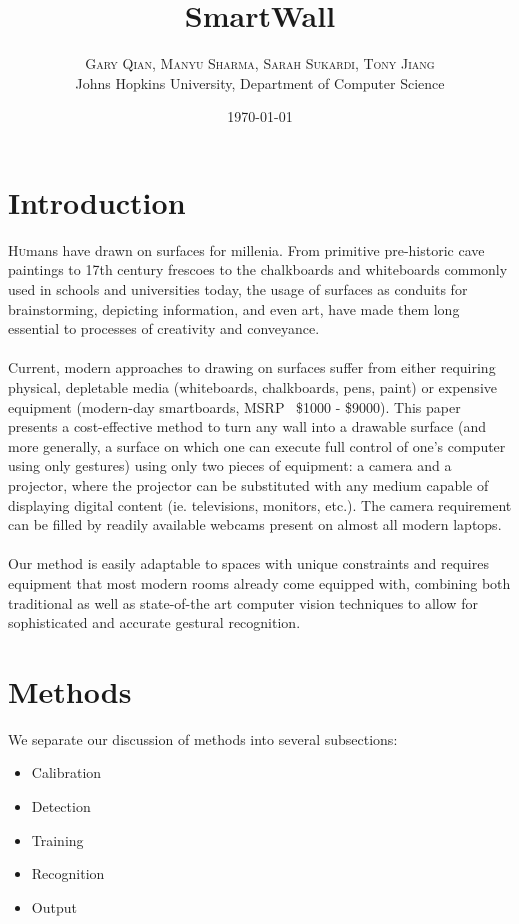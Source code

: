\documentclass[twoside,twocolumn]{article}
\title{SmartWall} %
\author{%
\textsc{Gary Qian, Manyu Sharma, Sarah Sukardi, Tony Jiang}\\[1ex] %
\normalsize Johns Hopkins University, Department of Computer Science \\ %
}
\date{\today} %
\begin{document}
\maketitle


\section{Introduction}

\lettrine[nindent=0em,lines=3]{H} umans have drawn on surfaces for millenia. From primitive pre-historic cave paintings to 17th century frescoes to the chalkboards and whiteboards commonly used in schools and universities today, the usage of surfaces as conduits for brainstorming, depicting information, and even art, have made them long essential to processes of creativity and conveyance.\\ \\Current, modern approaches to drawing on surfaces suffer from either requiring physical, depletable media (whiteboards, chalkboards, pens, paint) or expensive equipment (modern-day smartboards, MSRP ~\$1000 - \$9000). This paper presents a cost-effective method to turn any wall into a drawable surface (and more generally, a surface on which one can execute full control of one's computer using only gestures) using only two pieces of equipment: a camera and a projector, where the projector can be substituted with any medium capable of displaying digital content (ie. televisions, monitors, etc.). The camera requirement can be filled by readily available webcams present on almost all modern laptops.\\ \\ Our method is easily adaptable to spaces with unique constraints and requires equipment that most modern rooms already come equipped with, combining both traditional as well as state-of-the art computer vision techniques to allow for sophisticated and accurate gestural recognition.
\section{Methods}

We separate our discussion of methods into several subsections:
\begin{itemize}
\item Calibration
\item Detection
\item Training
\item Recognition
\item Output
\end{itemize}
\end{document}
